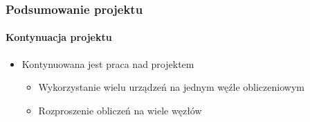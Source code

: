 \documentclass{beamer}
\begin{document}
\begin{frame}
\frametitle{Podsumowanie projektu}
\framesubtitle{Kontynuacja projektu}
\begin{itemize}
\item Kontynuowana jest praca nad projektem
	\begin{itemize}
	\item Wykorzystanie wielu urządzeń na jednym węźle obliczeniowym
	\item Rozproszenie obliczeń na wiele węzłów
	\end{itemize}
\end{itemize}
\end{frame}
\end{document}
